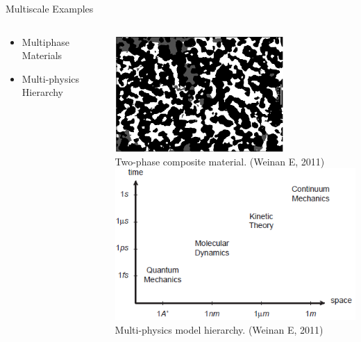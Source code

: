 \documentclass{beamer}
\begin{document}
	\begin{frame}[t]{Multiscale Examples}
		\begin{columns}[T]
			\begin{column}{0.5\textwidth}
				\begin{itemize}
					\item  Multiphase Materials
					\vspace{7.5em}
					\item  Multi-physics Hierarchy
				\end{itemize}
			\end{column}
			
			\begin{column}{0.6\textwidth}
				\includegraphics[width=0.7\textwidth]{multiphase.png}
				\centering\\\tiny Two-phase composite material. (Weinan E, 2011)\\
				\vspace{0.25em}\hspace{-1cm}\includegraphics[width=1\textwidth]{hierarchy.png}
				\centering\\\tiny Multi-physics model hierarchy. (Weinan E, 2011)\\
			\end{column}
		\end{columns}
	\end{frame}
	
\end{document}
